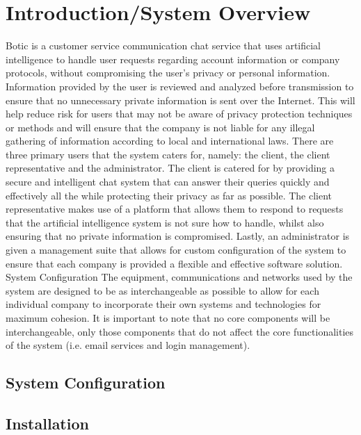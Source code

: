 \documentclass[11pt]{article}
\begin{document}
\section{Introduction/System Overview}
\begin{flushleft}
	Botic is a customer service communication chat service that uses artificial intelligence to handle user requests regarding account information or company protocols, without compromising the user’s privacy or personal information.
	Information provided by the user is reviewed and analyzed before transmission to ensure that no unnecessary private information is sent over the Internet. This will help reduce risk for users that may not be aware of privacy protection techniques or methods and will ensure that the company is not liable for any illegal gathering of information according to local and international laws.
	There are three primary users that the system caters for, namely: the client, the client representative and the administrator.
	The client is catered for by providing a secure and intelligent chat system that can answer their queries quickly and effectively all the while protecting their privacy as far as possible.
	The client representative makes use of a platform that allows them to respond to requests that the artificial intelligence system is not sure how to handle, whilst also ensuring that no private information is compromised.
	Lastly, an administrator is given a management suite that allows for custom configuration of the system to ensure that each company is provided a flexible and effective software solution.
	System Configuration
	The equipment, communications and networks used by the system are designed to be as interchangeable as possible to allow for each individual company to incorporate their own systems and technologies for maximum cohesion. It is important to note that no core components will be interchangeable, only those components that do not affect the core functionalities of the system (i.e. email services and login management).
\end{flushleft}
\subsection{System Configuration}

\subsection{Installation}
\end{document}
